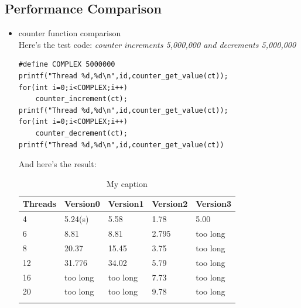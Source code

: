 \documentclass{article}
\begin{document}
	\subsection{Performance Comparison}
	\begin{itemize}
		\item counter function comparison \\
		Here's the test code: \emph{counter increments 5,000,000 and decrements 5,000,000} \\
		\begin{lstlisting}
#define COMPLEX 5000000
printf("Thread %d,%d\n",id,counter_get_value(ct));
for(int i=0;i<COMPLEX;i++)
	counter_increment(ct);
printf("Thread %d,%d\n",id,counter_get_value(ct));
for(int i=0;i<COMPLEX;i++)
	counter_decrement(ct);
printf("Thread %d,%d\n",id,counter_get_value(ct))
		\end{lstlisting}
		And here's the result: \\
		\begin{longtable}[c]{@{}lllll@{}}
			\toprule
			Threads                  & Version0                      & Version1                      & Version2                   & Version3                      \\* \midrule
			\endfirsthead
			\endhead
			\multicolumn{1}{|l|}{4}  & \multicolumn{1}{l|}{5.24(s)}     & \multicolumn{1}{l|}{5.58}     & \multicolumn{1}{l|}{1.78}  & \multicolumn{1}{l|}{5.00}    \\* \midrule
			\multicolumn{1}{|l|}{6}  & \multicolumn{1}{l|}{8.81}     & \multicolumn{1}{l|}{8.81}     & \multicolumn{1}{l|}{2.795} & \multicolumn{1}{l|}{too long} \\* \midrule
			\multicolumn{1}{|l|}{8}  & \multicolumn{1}{l|}{20.37}    & \multicolumn{1}{l|}{15.45}    & \multicolumn{1}{l|}{3.75}  & \multicolumn{1}{l|}{too long} \\* \midrule
			\multicolumn{1}{|l|}{12} & \multicolumn{1}{l|}{31.776}   & \multicolumn{1}{l|}{34.02}    & \multicolumn{1}{l|}{5.79}  & \multicolumn{1}{l|}{too long} \\* \midrule
			\multicolumn{1}{|l|}{16} & \multicolumn{1}{l|}{too long} & \multicolumn{1}{l|}{too long} & \multicolumn{1}{l|}{7.73}  & \multicolumn{1}{l|}{too long} \\* \midrule
			\multicolumn{1}{|l|}{20} & \multicolumn{1}{l|}{too long} & \multicolumn{1}{l|}{too long} & \multicolumn{1}{l|}{9.78}  & \multicolumn{1}{l|}{too long} \\* \bottomrule
			\caption{My caption}
			\label{my-label}
		\end{longtable}

\end{itemize}
\end{document}
